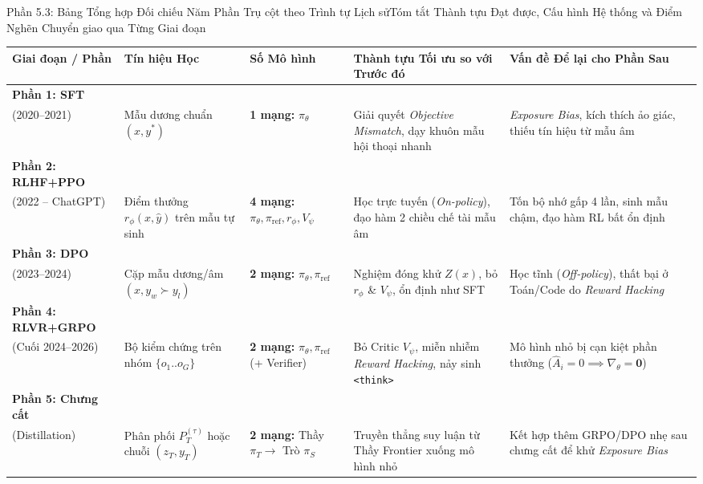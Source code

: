 \begin{frame}{Phần 5.3: Bảng Tổng hợp Đối chiếu Năm Phần Trụ cột theo Trình tự Lịch sử}{Tóm tắt Thành tựu Đạt được, Cấu hình Hệ thống và Điểm Nghẽn Chuyển giao qua Từng Giai đoạn}
  \vspace{0.02cm}
  \scriptsize
  \renewcommand{\arraystretch}{1.18}
  \begin{tabularx}{\textwidth}{@{}p{2.35cm} p{2.15cm} p{2.05cm} X X@{}}
    \toprule
    \textbf{Giai đoạn / Phần} & \textbf{Tín hiệu Học} & \textbf{Số Mô hình} & \textbf{Thành tựu Tối ưu so với Trước đó} & \textbf{Vấn đề Để lại cho Phần Sau} \\
    \midrule
    \textbf{Phần 1: SFT}\\(2020--2021) & Mẫu dương chuẩn $(x, y^*)$ & \textbf{1 mạng:} $\pi_\theta$ & Giải quyết \textit{Objective Mismatch}, dạy khuôn mẫu hội thoại nhanh & \textit{Exposure Bias}, kích thích ảo giác, thiếu tín hiệu từ mẫu âm \\
    \hline
    \textbf{Phần 2: RLHF+PPO}\\(2022 -- ChatGPT) & Điểm thưởng $r_\phi(x, \hat{y})$ trên mẫu tự sinh & \textbf{4 mạng:} $\pi_\theta, \pi_{\text{ref}}, r_\phi, V_\psi$ & Học trực tuyến (\textit{On-policy}), đạo hàm 2 chiều chế tài mẫu âm & Tốn bộ nhớ gấp 4 lần, sinh mẫu chậm, đạo hàm RL bất ổn định \\
    \hline
    \textbf{Phần 3: DPO}\\(2023--2024) & Cặp mẫu dương/âm $(x, y_w \succ y_l)$ & \textbf{2 mạng:} $\pi_\theta, \pi_{\text{ref}}$ & Nghiệm đóng khử $Z(x)$, bỏ $r_\phi$ \& $V_\psi$, ổn định như SFT & Học tĩnh (\textit{Off-policy}), thất bại ở Toán/Code do \textit{Reward Hacking} \\
    \hline
    \textbf{Phần 4: RLVR+GRPO}\\(Cuối 2024--2026) & Bộ kiểm chứng trên nhóm $\{o_1..o_G\}$ & \textbf{2 mạng:} $\pi_\theta, \pi_{\text{ref}}$ (+ Verifier) & Bỏ Critic $V_\psi$, miễn nhiễm \textit{Reward Hacking}, nảy sinh \texttt{<think>} & Mô hình nhỏ bị cạn kiệt phần thưởng ($\hat{A}_i = 0 \implies \nabla_\theta = \mathbf{0}$) \\
    \hline
    \textbf{Phần 5: Chưng cất}\\(Distillation) & Phân phối $P_T^{(\tau)}$ hoặc chuỗi $(z_T, y_T)$ & \textbf{2 mạng:} Thầy $\pi_T \to$ Trò $\pi_S$ & Truyền thẳng suy luận từ Thầy Frontier xuống mô hình nhỏ & Kết hợp thêm GRPO/DPO nhẹ sau chưng cất để khử \textit{Exposure Bias} \\
    \bottomrule
  \end{tabularx}
\end{frame}

